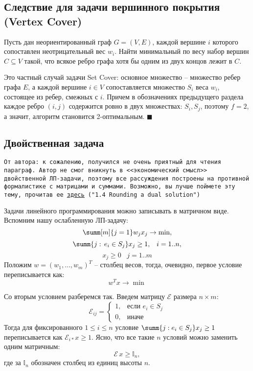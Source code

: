 \subsection{Следствие для задачи вершинного покрытия (Vertex Cover)}
 {Пусть дан неориентированный граф $G = (V, E)$, каждой вершине $i$ которого сопоставлен неотрицательный вес $w_i$. Найти минимальный по весу набор вершин $C \subseteq V$ такой, что всякое ребро графа хотя бы одним из двух концов лежит в $C$.} 

 Это частный случай задачи Set Cover: основное множество -- множество ребер графа $E$, а каждой вершине $i \in V$ сопоставляется множество $S_i$ веса $w_i$, состоящее из ребер, смежных с $i$. Причем в обозначениях предыдущего раздела каждое ребро $(i, j)$ содержится ровно в двух множествах: $S_i, S_j$, поэтому $f = 2$, а значит, алгоритм становится 2-оптимальным. $\blacksquare$

\subsection{Двойственная задача}
\texttt{От автора: к сожалению, получился не очень приятный для чтения параграф. Автор не смог вникнуть в <<экономический смысл>> двойственной ЛП-задачи, поэтому все рассуждения построены на противной формалистике с матрицами и суммами. Возможно, вы лучше поймете эту тему, прочитав ее
\texttt{\href{https://www.designofapproxalgs.com/book.pdf}{\underline{здесь}}} 
("1.4 Rounding a dual solution")
}

Задачи линейного программирования можно записывать в матричном виде. Вспомним нашу ослабленную ЛП-задачу:
$$ \summ[m]{j=1} w_j x_j \rightarrow \min,$$
$$ \summ{j:\, e_i \in S_j} x_j \geq 1, \;\;\; i=1..n,$$
$$ x_j \geq 0 \;\;\; j=1..m$$
Положим $w = (w_1, ..., w_m)^T$ -- столбец весов, тогда, очевидно, первое условие переписывается как: $$w^Tx \rightarrow \min$$

Со вторым условием разберемся так. Введем матрицу $\mathcal E$ размера $n \times m$:
$$
\mathcal{E}_{ij} = \begin{cases}
1, & \text{если } e_i \in S_j \\
0, & \text{иначе}
\end{cases}
$$
Тогда для фиксированного $1\leq i \leq n$ условие $\summ{j: e_i \in S_j} x_j \geq 1$ переписывается как $\mathcal{E}_{i*} x \geq 1$. Ясно, что все такие $n$ условий можно заменить одним матричным: $$\mathcal{E}\,x \geq \mathbb I_n,$$ где за $\mathbb I_n$ обозначен столбец из единиц высоты $n$. 

